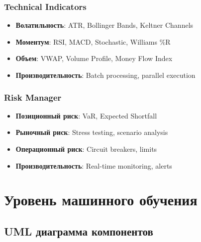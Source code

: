 \documentclass[12pt,a4paper]{article}
\begin{document}
\subsubsection{Technical Indicators}
\begin{itemize}
    \item \textbf{Волатильность}: ATR, Bollinger Bands, Keltner Channels
    \item \textbf{Моментум}: RSI, MACD, Stochastic, Williams \%R
    \item \textbf{Объем}: VWAP, Volume Profile, Money Flow Index
    \item \textbf{Производительность}: Batch processing, parallel execution
\end{itemize}

\subsubsection{Risk Manager}
\begin{itemize}
    \item \textbf{Позиционный риск}: VaR, Expected Shortfall
    \item \textbf{Рыночный риск}: Stress testing, scenario analysis
    \item \textbf{Операционный риск}: Circuit breakers, limits
    \item \textbf{Производительность}: Real-time monitoring, alerts
\end{itemize}

\section{Уровень машинного обучения}

\subsection{UML диаграмма компонентов}
\end{document}
